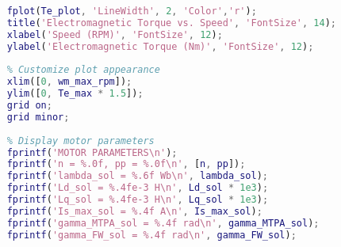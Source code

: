 \begin{lstlisting}[language=Matlab, basicstyle=\ttfamily\small, breaklines=true, frame=single]
	% Plot the electromagnetic torque
	fplot(Te_plot, 'LineWidth', 2, 'Color','r');
	title('Electromagnetic Torque vs. Speed', 'FontSize', 14);
	xlabel('Speed (RPM)', 'FontSize', 12);
	ylabel('Electromagnetic Torque (Nm)', 'FontSize', 12);
	
	% Customize plot appearance
	xlim([0, wm_max_rpm]);
	ylim([0, Te_max * 1.5]);
	grid on;
	grid minor;
	
	% Display motor parameters
	fprintf('MOTOR PARAMETERS\n');
	fprintf('n = %.0f, pp = %.0f\n', [n, pp]);
	fprintf('lambda_sol = %.6f Wb\n', lambda_sol);
	fprintf('Ld_sol = %.4fe-3 H\n', Ld_sol * 1e3);
	fprintf('Lq_sol = %.4fe-3 H\n', Lq_sol * 1e3);
	fprintf('Is_max_sol = %.4f A\n', Is_max_sol);
	fprintf('gamma_MTPA_sol = %.4f rad\n', gamma_MTPA_sol);
	fprintf('gamma_FW_sol = %.4f rad\n', gamma_FW_sol);
	
\end{lstlisting}
